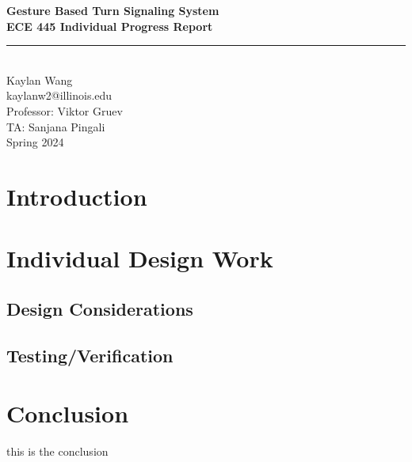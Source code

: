 \documentclass[12pt]{article}
\begin{document}
\begin{titlepage}
\centering
{}
{\LARGE\textbf{Gesture Based Turn Signaling System }}\\[1cm] 
{\large\textbf{ECE 445 Individual Progress Report}}\\[0.3cm]
\rule{\textwidth}{1pt}\\
{\Large Kaylan Wang}\\[1cm] 
{\small kaylanw2@illinois.edu}\\[0cm] 
{\small Professor: Viktor Gruev}\\[0cm]
{\small TA: Sanjana Pingali}\\[0cm]


{\small Spring 2024}\\[0.5cm]

\end{titlepage} 

\newpage
\tableofcontents 
\newpage
\section{Introduction}
\section{Individual Design Work}
\subsection{Design Considerations}
\subsection{Testing/Verification}
\section{Conclusion}
this is the conclusion \cite{STMicroelectronics2015LSM9DS1}
\newpage

\end{document}

